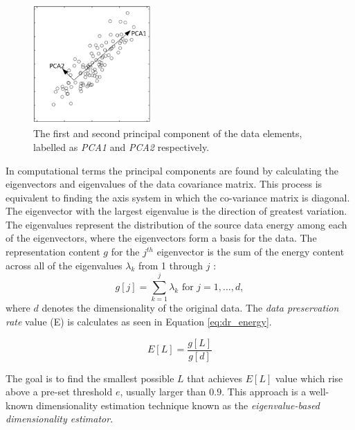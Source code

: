 \begin{figure}
\centering
\includegraphics[width=0.4\textwidth]{./figures/pca_demo}       
\caption{The first and second principal component of the data elements, labelled as \emph{PCA1} and \emph{PCA2 }respectively.}
\label{fig:pca_demo}
\end{figure}

\iftoggle{edit-mode}{\hspace{0pt}\marginpar{PCA formulation}}{}
In computational terms the principal components are found by calculating the eigenvectors and eigenvalues of the data covariance matrix. 
This process is equivalent to finding the axis system in which the co-variance matrix is diagonal. 
The eigenvector with the largest eigenvalue is the direction of greatest variation. 
The eigenvalues represent the distribution of the source data energy among each of the eigenvectors, where the eigenvectors form a basis for the data. 
The representation content $g$ for the $j^{th}$ eigenvector is the sum of the energy content across all of the eigenvalues $\lambda_k$ from 1 through $j$ :
\begin{equation}
g[j]=\sum_{k=1}^{j}\lambda_k \text{   for   } j=1,...,d,
\end{equation}
where $d$ denotes the dimensionality of the original data. 
The \emph{data preservation rate} value (E) is calculates as seen in Equation \ref{eq:dr_energy}. 

\begin{equation}
E[L] = \frac{g[L]}{g[d]}
\label{eq:dr_energy} 
\end{equation} 

The goal is to find the smallest possible $L$ that achieves $E[L]$ value which rise above a pre-set threshold $e$, usually larger than $0.9$. 
This approach is a well-known dimensionality estimation technique known as the \emph{eigenvalue-based dimensionality estimator}. 

